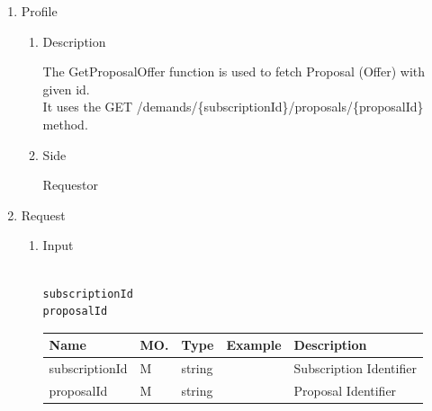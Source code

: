 \begin{enumerate}

\item Profile

\begin{enumerate}

\item Description

The GetProposalOffer function is used to fetch Proposal (Offer) with given id. \\
It uses the GET /demands/\{subscriptionId\}/proposals/\{proposalId\} method.

\item Side

Requestor

\end{enumerate}

\item Request

\begin{enumerate}

\item Input

\begin{tcolorbox}[boxrule=0pt, frame empty]
\begin{verbatim}

subscriptionId
proposalId

\end{verbatim}
\end{tcolorbox}


\begin{center}
\begin{tabular}{|p{3cm}|l|p{3cm}|p{3cm}|p{4cm}|} 
\hline
\rowcolor{lightgray}	Name	& MO.	& Type	& Example & 	Description \\
\hline

subscriptionId	& M	& 	string			&		&	Subscription Identifier \\ 

\hline

proposalId		& M & 	string			&		&	Proposal Identifier \\

\hline	


\end{tabular}
\end{center}
\end{enumerate}
\end{enumerate}
